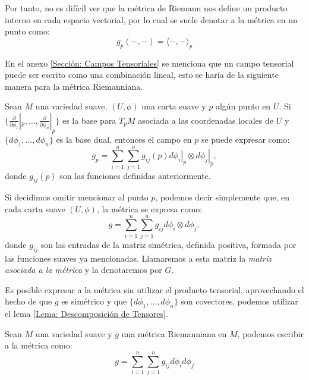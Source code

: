 Por tanto, no es difícil ver que la métrica de Riemann nos define un producto interno en cada espacio vectorial, por lo cual se suele denotar a la métrica en un punto como:
\[
	g_{p}(-,-) = \langle - , - \rangle_{p}
\]

En el anexo \ref{Sección: Campos Tensoriales} se menciona que un campo tensorial puede ser escrito como una combinación lineal, esto se haría de la siguiente manera para la métrica Riemanniana.

Sean $M$ una variedad suave, $(U, \phi)$ una carta suave y $p$ algún punto en $U$. Si $\{
	\frac{\partial}{\partial \phi_{1}} |_{p}, \ldots,
	\frac{\partial}{\partial \phi_{n}} |_{p}
	\}$ es la base para $T_{p}M$ asociada a las coordenadas locales de $U$ y $\{d\phi_{1}, \ldots, d\phi_{n}\}$ es la base dual, entonces el campo en $p$ se puede expresar como:
\[
	g_{p} = \sum_{i=1}^{n}\sum_{j=1}^{n} g_{ij}(p)
	\left. d\phi_{i} \right|_{p} \otimes
	\left. d\phi_{j} \right|_{p},
\]
donde $g_{ij}(p)$ son las funciones definidas anteriormente.

Si decidimos omitir mencionar al punto $p$, podemos decir simplemente que, en cada carta suave $(U,\phi)$, la métrica se expresa como:
\[
	g = \sum_{i=1}^{n}\sum_{j=1}^{n} g_{ij} d\phi_{i} \otimes d\phi_j,
\]
donde $g_{ij}$ son las entradas de la matriz simétrica, definida positiva, formada por las funciones suaves ya mencionadas. Llamaremos a esta matriz la \textit{matriz asociada a la métrica} y la denotaremos por $G$.

Es posible expresar a la métrica sin utilizar el producto tensorial, aprovechando el hecho de que $g$ es simétrico y que $\{d\phi_1,\ldots, d\phi_{n}\}$ son covectores, podemos utilizar el lema \ref{Lema: Descomposición de Tensores}.

\begin{lemma}
	Sean $M$ una variedad suave y $g$ una métrica Riemanniana en $M$, podemos escribir a la métrica como:
	\[
		g = \sum_{i=1}^{n}\sum_{j=1}^{n} g_{ij}d\phi_{i}d\phi_{j}
	\]
\end{lemma}

